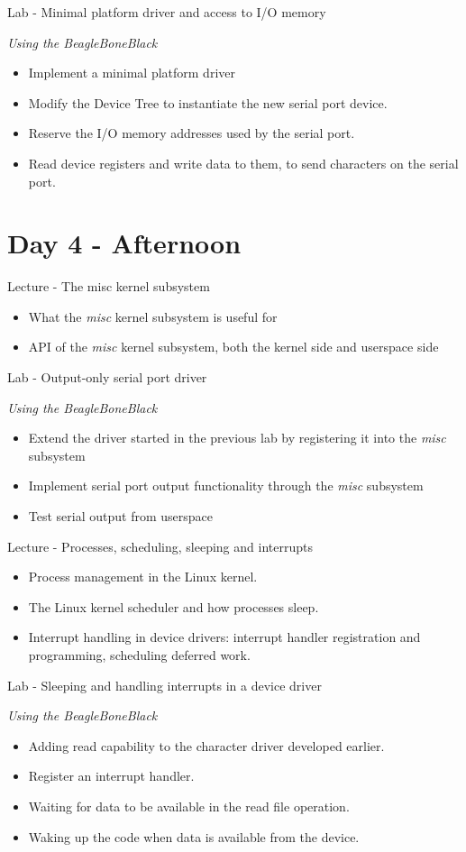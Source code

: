 \documentclass[a4paper,12pt,obeyspaces,spaces,hyphens]{article}
\begin{document}
\feagendaonecolumn
{Lab - Minimal platform driver and access to I/O memory}
{
  {\em Using the BeagleBoneBlack}
  \begin{itemize}
  \item Implement a minimal platform driver
  \item Modify the Device Tree to instantiate the new serial port
    device.
  \item Reserve the I/O memory addresses used by the serial port.
  \item Read device registers and write data to them, to send
    characters on the serial port.
  \end{itemize}
}

\section{Day 4 - Afternoon}

\feagendatwocolumn
{Lecture - The misc kernel subsystem}
{
  \begin{itemize}
  \item What the {\em misc} kernel subsystem is useful for
  \item API of the {\em misc} kernel subsystem, both the kernel side
    and userspace side
  \end{itemize}
}
{Lab - Output-only serial port driver}
{
  {\em Using the BeagleBoneBlack}
  \begin{itemize}
  \item Extend the driver started in the previous lab by registering
    it into the {\em misc} subsystem
  \item Implement serial port output functionality through the {\em
      misc} subsystem
  \item Test serial output from userspace
  \end{itemize}
}

\feagendatwocolumn
{Lecture - Processes, scheduling, sleeping and interrupts}
{
  \begin{itemize}
  \item Process management in the Linux kernel.
  \item The Linux kernel scheduler and how processes sleep.
  \item Interrupt handling in device drivers: interrupt handler
    registration and programming, scheduling deferred work.
  \end{itemize}
}
{Lab - Sleeping and handling interrupts in a device driver}
{
  {\em Using the BeagleBoneBlack}
  \begin{itemize}
  \item Adding read capability to the character driver developed
    earlier.
  \item Register an interrupt handler.
  \item Waiting for data to be available in the read file operation.
  \item Waking up the code when data is available from the device.
  \end{itemize}
}
\end{document}
